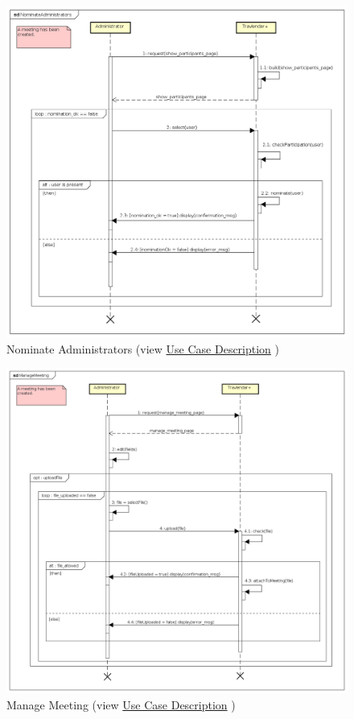 \begin{figure}[H]
\centering\includegraphics[width=\textwidth]{Images/SequenceDiagrams/Admin/NominateAdministrators.png}{}
\caption[Nominate Administrators]{{Nominate Administrators}\label{SeqDiagr:NominateAdmin} (view \hyperref[UseCaseDescr:NominateAdmin]{Use Case Description} )}
\end{figure}

\begin{figure}[H]
\centering\includegraphics[width=\textwidth]{Images/SequenceDiagrams/Admin/ManageMeeting.png}{}
\caption[Manage Meeting]{{Manage Meeting}\label{SeqDiagr:ManageMeeting} (view \hyperref[UseCaseDescr:ManageMeeting]{Use Case Description} )}
\end{figure}

